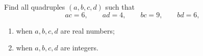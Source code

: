 Find all quadruples $(a,b,c,d)$ such that
\[ac=6,\qquad ad=4,\qquad bc=9,\qquad bd=6,\]
\begin{enumerate}
\item[(a)] when $a,b,c,d$ are real numbers;
\item[(b)] when $a,b,c,d$ are integers.
\end{enumerate}
